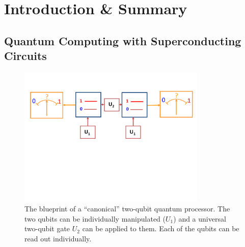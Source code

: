 \chapter{Introduction \& Summary}




\section{Quantum Computing with Superconducting Circuits}

%
\begin{figure}
\centering \includegraphics[width=0.8\textwidth]{./material/papers/grover/submission1/Fig1}
\caption[Blueprint of a {}``canonical'' two-qubit quantum processor]{The blueprint of a {}``canonical'' two-qubit quantum processor.
The two qubits can be individually manipulated ($U_{1}$) and
a universal two-qubit gate $U_{2}$ can be applied to them. Each of
the qubits can be read out individually.}


\label{fig:qubit_processor_blueprint} %
\end{figure}


